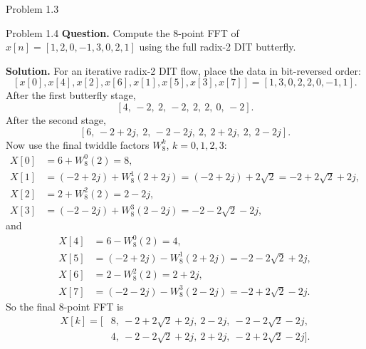\documentclass[10pt]{article}
\newcommand{\Prompt}[1]{\textbf{Question.} #1}
\newcommand{\SketchLabel}{\tcblower\textbf{Solution.}}
\begin{document}
\begin{examplebox}{Problem 1.3}
\begin{center}
  \end{center}
\end{examplebox}

\begin{examplebox}{Problem 1.4}
  \Prompt{Compute the 8-point FFT of \(x[n]=[1,2,0,-1,3,0,2,1]\) using the full radix-2 DIT butterfly.}

  \medskip
  \SketchLabel{}
  For an iterative radix-2 DIT flow, place the data in bit-reversed order:
  \[
    [x[0],x[4],x[2],x[6],x[1],x[5],x[3],x[7]]
    =[1,3,0,2,2,0,-1,1].
  \]
  After the first butterfly stage,
  \[
    [4,\,-2,\ 2,\,-2,\ 2,\ 2,\ 0,\,-2].
  \]
  After the second stage,
  \[
    [6,\,-2+2j,\ 2,\,-2-2j,\ 2,\ 2+2j,\ 2,\ 2-2j].
  \]
  Now use the final twiddle factors \(W_8^k\), \(k=0,1,2,3\):
  \[
    \begin{aligned}
      X[0]&=6+W_8^0(2)=8,\\
      X[1]&=(-2+2j)+W_8^1(2+2j)=(-2+2j)+2\sqrt2= -2+2\sqrt2+2j,\\
      X[2]&=2+W_8^2(2)=2-2j,\\
      X[3]&=(-2-2j)+W_8^3(2-2j)= -2-2\sqrt2-2j,
    \end{aligned}
  \]
  and
  \[
    \begin{aligned}
      X[4]&=6-W_8^0(2)=4,\\
      X[5]&=(-2+2j)-W_8^1(2+2j)= -2-2\sqrt2+2j,\\
      X[6]&=2-W_8^2(2)=2+2j,\\
      X[7]&=(-2-2j)-W_8^3(2-2j)= -2+2\sqrt2-2j.
    \end{aligned}
  \]
  So the final 8-point FFT is
  \[
    \begin{aligned}
      X[k]=[&8,\ -2+2\sqrt2+2j,\ 2-2j,\ -2-2\sqrt2-2j,\\
      &4,\ -2-2\sqrt2+2j,\ 2+2j,\ -2+2\sqrt2-2j ].
    \end{aligned}
  \]


\end{examplebox}
\end{document}
